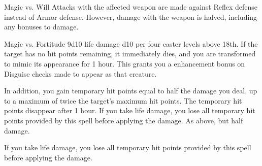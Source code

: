 \begin{spellheader}
\end{spellheader}
\begin{spelleffects}
    \spellrng{\rngtouch}
    \spelldur{\rngclose}
    \begin{spellattack}{Magic vs. Will}
        \spellsuccess Attacks with the affected weapon are made against Reflex defense instead of Armor defense. However, damage with the weapon is halved, including any bonuses to damage.
    \end{spellattack}
\end{spelleffects}
\begin{spellfooter}

\end{spellfooter}

\begin{spellheader}
\end{spellheader}
\begin{spelleffects}
    \spellrng{\rngclose}
    \begin{spellattack}{Magic vs. Fortitude}
        \spellsuccess 9d10 life damage \add d10 per four caster levels above 18th. If the target has no hit points remaining, it immediately dies, and you are transformed to mimic its appearance for 1 hour. This grants you a  enhancement bonus on Disguise checks made to appear as that creature.

        In addition, you gain temporary hit points equal to half the damage you deal, up to a maximum of twice the target's maximum hit points. The temporary hit points disappear after 1 hour. If you take life damage, you lose all temporary hit points provided by this spell before applying the damage.
        \spellfailure As above, but half damage.
    \end{spellattack}
\end{spelleffects}
\begin{spellfooter}
    \spellnotes If you take life damage, you lose all temporary hit points provided by this spell before applying the damage.
\end{spellfooter}


